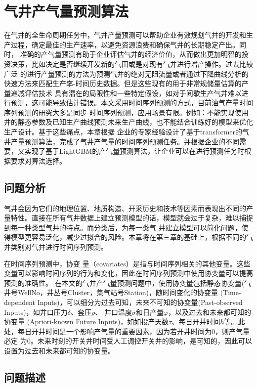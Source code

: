 \chapter{气井产气量预测算法}
在气井的全生命周期任务中，气井产量预测可以帮助企业有效规划气井的开发和生产过程，确定最佳的生产速率，以避免资源浪费和确保气井的长期稳定产出。同时，
准确的产气量预测有助于企业评估气井的经济价值，从而做出更加明智的投资决策，比如决定是否继续开发新的气田或是对现有气井进行增产操作。过去比较广泛
的进行产量预测的方法为预测气井的绝对无阻流量或者通过下降曲线分析的快速方法来匹配生产率-时间历史数据。但是这些现有的用于非常规储量估算的产量递减评估技术
具有潜在的局限性和一些特定假设，如对于间歇生产气井难以进行预测，这可能导致估计错误。本文采用时间序列预测的方式，目前油气产量时间序列预测的研究大多是同步
时间序列预测，应用场景有限。例如：不能实现使用井的静态参数及已知生产曲线预测未来生产曲线，也不能结合训练好的模型来优化生产设计。基于这些痛点，本章根据
企业的专家经验设计了基于transformer的气井产量预测算法，完成了气井产气量的时间序列预测任务。并根据企业的不同需要，又实现了基于LightGBM的产气量预测算法，让企业可以在进行预测任务时根据要求对算法选择。
\section{问题分析}
气井会因为它们的地理位置、地质构造、开采历史和技术等因素而表现出不同的产量特性。直接在所有气井数据上建立预测模型的话，模型就会过于复杂，难以捕捉到每一种类型气井的特点。而分类后，为每一类气
井建立模型可以简化问题，使得模型更容易泛化，减少过拟合的风险。本章将在第三章的基础上，根据不同的气井类别对气井进行时间序列预测。

在时间序列预测中，协变
量（covariates）是指与时间序列相关的其他变量。这些变量可以影响时间序列的行为和变化，因此在时间序列预测中使用协变量可以提高预测的准确性。
在本文的气井产气量预测问题中，使用协变量包括静态协变量(气井号WellNo，井丛号Cluster，集气站号Station)，随时间变化的协变量
(Time-dependent Inputs)，可以细分为过去可知，未来不可知的协变量(Past-observed Inputs)，如井口压力\( \delta \)、套压\( \rho \)、
井口温度\( \sigma \)和日产量$\varphi $，以及过去和未来都可知的协变量
(Apriori-known Future Inputs)，如如投产天数\( \tau \)、每日开井时间$h$等。此处，每日开井时间是一个影响产气量的重要因素，因为若开井时间为0，则产气量必定
为0。未来时刻的开关井时间受人工调控开关井的影响，是可知的，因此可以设置为过去和未来都可知的协变量。
\section{问题描述}
